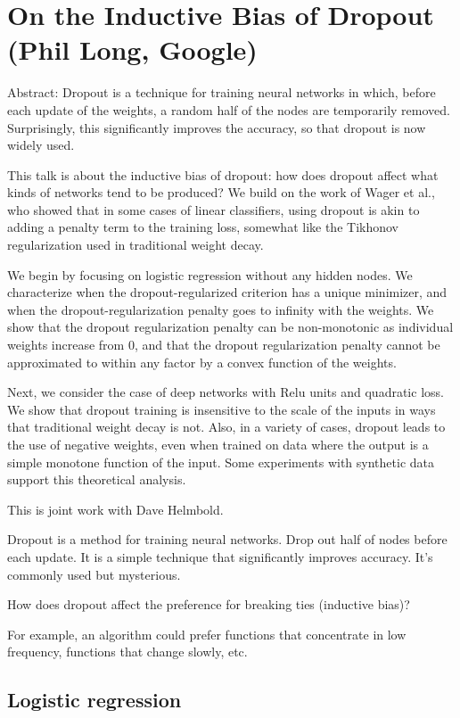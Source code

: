 \section{On the Inductive Bias of Dropout (Phil Long, Google)}

Abstract:
Dropout is a technique for training neural networks in which, before
each update of the weights, a random half of the nodes are temporarily
removed.  Surprisingly, this significantly improves the accuracy, so
that dropout is now widely used.

This talk is about the inductive bias of dropout: how does dropout
affect what kinds of networks tend to be produced?  We build on the
work of Wager et al., who showed that in some cases of linear
classifiers, using dropout is akin to adding a penalty term to the
training loss, somewhat like the Tikhonov regularization used in
traditional weight decay.

We begin by focusing on logistic regression without any hidden nodes.
We characterize when the dropout-regularized criterion has a unique
minimizer, and when the dropout-regularization penalty goes to
infinity with the weights.  We show that the dropout regularization
penalty can be non-monotonic as individual weights increase from 0,
and that the dropout regularization penalty cannot be approximated to
within any factor by a convex function of the weights.

Next, we consider the case of deep networks with Relu units and
quadratic loss.  We show that dropout training is insensitive to the
scale of the inputs in ways that traditional weight decay is not.
Also, in a variety of cases, dropout leads to the use of negative
weights, even when trained on data where the output is a simple
monotone function of the input.  Some experiments with synthetic data
support this theoretical analysis.

This is joint work with Dave Helmbold.

Dropout is a method for training neural networks. Drop out half of nodes before each update. It is a simple technique that significantly improves accuracy. It's commonly used but mysterious.

How does dropout affect the preference for breaking ties (inductive bias)?

For example, an algorithm could prefer functions that concentrate in low frequency, functions that change slowly, etc.

\subsection{Logistic regression}

